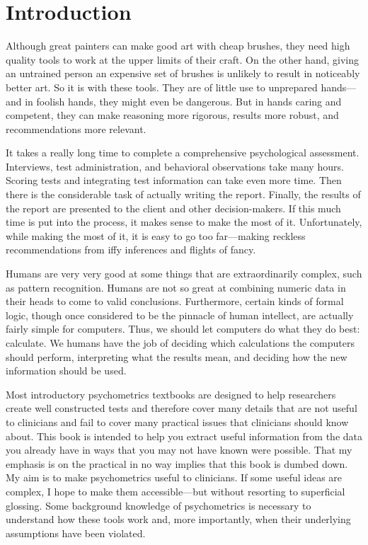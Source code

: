 \documentclass[nohyper,justified,marginals=raggedright]{tufte-book}\usepackage[]{graphicx}\usepackage[]{color}
\begin{document}
\chapter{Introduction}
Although great painters can make good art with cheap brushes, they need high quality tools to work at the upper limits of their craft. On the other hand, giving an untrained person an expensive set of brushes is unlikely to result in noticeably better art. So it is with these tools. They are of little use to unprepared hands---and in foolish hands, they might even be dangerous. But in hands caring and competent, they can make reasoning more rigorous, results more robust, and recommendations more relevant.

It takes a really long time to complete a comprehensive psychological assessment. Interviews, test administration, and behavioral observations take many hours. Scoring tests and integrating test information can take even more time. Then there is the considerable task of actually writing the report. Finally, the results of the report are presented to the client and other decision-makers. If this much time is put into the process, it makes sense to make the most of it. Unfortunately, while making the most of it, it is easy to go too far---making reckless recommendations from iffy inferences and flights of fancy.

Humans are very very good at some things that are extraordinarily complex, such as pattern recognition. Humans are not so great at combining numeric data in their heads to come to valid conclusions. Furthermore, certain kinds of formal logic, though once considered to be the pinnacle of human intellect, are actually fairly simple for computers. Thus, we should let computers do what they do best: calculate. We humans have the job of deciding which calculations the computers should perform, interpreting what the results mean, and deciding how the new information should be used.

Most introductory psychometrics textbooks are designed to help researchers create well constructed tests and therefore cover many details that are not useful to clinicians and fail to cover many practical issues that clinicians should know about. This book is intended to help you extract useful information from the data you already have in ways that you may not have known were possible. That my emphasis is on the practical in no way implies that this book is dumbed down. My aim is to make psychometrics useful to clinicians. If some useful ideas are complex, I hope to make them accessible---but without resorting to superficial glossing. Some background knowledge of psychometrics is necessary to understand how these tools work and, more importantly, when their underlying assumptions have been violated.
\end{document}
